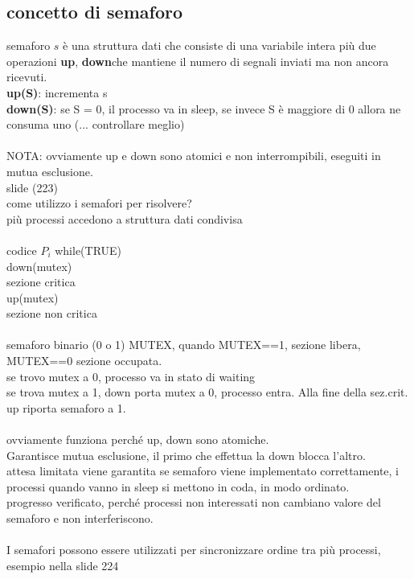 \documentclass{article}
\begin{document}
\subsection{concetto di semaforo}
semaforo $s$ è una struttura dati che consiste di una variabile intera più due operazioni \textbf{up}, \textbf{down}che mantiene il numero di segnali inviati ma non ancora ricevuti.\\
\textbf{up(S)}: incrementa s\\
\textbf{down(S)}: se S = 0, il processo va in sleep, se invece S è maggiore di 0 allora ne consuma uno (... controllare meglio)\\
\\
NOTA: ovviamente up e down sono atomici e non interrompibili, eseguiti in mutua esclusione.\\
slide (223)
\\
come utilizzo i semafori per risolvere?\\
più processi accedono a struttura dati condivisa\\
\\
codice $P_i$
while(TRUE)\\
down(mutex)\\
sezione critica\\
up(mutex)\\
sezione non critica\\
\\
semaforo binario (0 o 1) MUTEX, quando MUTEX==1, sezione libera, MUTEX==0 sezione occupata.\\
se trovo mutex a 0, processo va in stato di waiting\\
se trova mutex a 1, down porta mutex a 0, processo entra. Alla fine della sez.crit. up riporta semaforo a 1.\\
\\
ovviamente funziona perché up, down sono atomiche.\\
Garantisce mutua esclusione, il primo che effettua la down blocca l'altro.\\
attesa limitata viene garantita se semaforo viene implementato correttamente, i processi quando vanno in sleep si mettono in coda, in modo ordinato.\\
progresso verificato, perché processi non interessati non cambiano valore del semaforo e non interferiscono.\\
\\
I semafori possono essere utilizzati per sincronizzare ordine tra più processi, esempio nella slide 224\\
\end{document}
